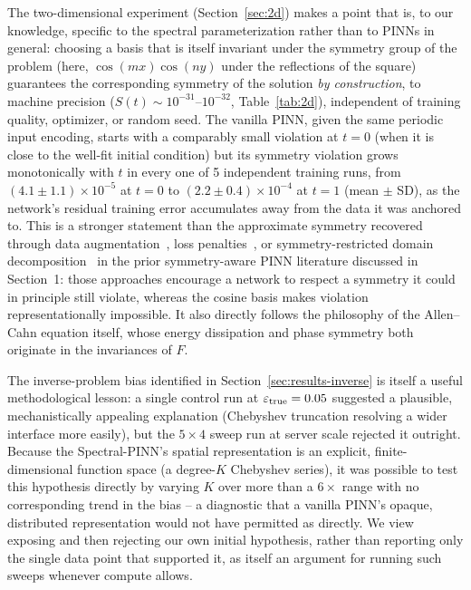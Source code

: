 \documentclass[symmetry,article,submit,moreauthors]{Definitions/mdpi}
\begin{document}
The two-dimensional experiment (Section~\ref{sec:2d}) makes a point that is, to our knowledge, specific to the spectral parameterization rather than to PINNs in general: choosing a basis that is itself invariant under the symmetry group of the problem (here, $\cos(mx)\cos(ny)$ under the reflections of the square) guarantees the corresponding symmetry of the solution \emph{by construction}, to machine precision ($S(t)\sim10^{-31}$--$10^{-32}$, Table~\ref{tab:2d}), independent of training quality, optimizer, or random seed. The vanilla PINN, given the same periodic input encoding, starts with a comparably small violation at $t=0$ (when it is close to the well-fit initial condition) but its symmetry violation grows monotonically with $t$ in every one of 5 independent training runs, from $(4.1\pm1.1)\times10^{-5}$ at $t=0$ to $(2.2\pm0.4)\times10^{-4}$ at $t=1$ (mean $\pm$ SD), as the network's residual training error accumulates away from the data it was anchored to. This is a stronger statement than the approximate symmetry recovered through data augmentation~\cite{Brandstetter2022}, loss penalties~\cite{Zhang_SPINN2023,Zhu_SPINN2022}, or symmetry-restricted domain decomposition~\cite{Liu_SymDD2024} in the prior symmetry-aware PINN literature discussed in Section~1: those approaches encourage a network to respect a symmetry it could in principle still violate, whereas the cosine basis makes violation representationally impossible. It also directly follows the philosophy of the Allen--Cahn equation itself, whose energy dissipation and phase symmetry both originate in the invariances of $F$.

The inverse-problem bias identified in Section~\ref{sec:results-inverse} is itself a useful methodological lesson: a single control run at $\varepsilon_{\rm true}=0.05$ suggested a plausible, mechanistically appealing explanation (Chebyshev truncation resolving a wider interface more easily), but the $5\times4$ sweep run at server scale rejected it outright. Because the Spectral-PINN's spatial representation is an explicit, finite-dimensional function space (a degree-$K$ Chebyshev series), it was possible to test this hypothesis directly by varying $K$ over more than a $6\times$ range with no corresponding trend in the bias -- a diagnostic that a vanilla PINN's opaque, distributed representation would not have permitted as directly. We view exposing and then rejecting our own initial hypothesis, rather than reporting only the single data point that supported it, as itself an argument for running such sweeps whenever compute allows.
\end{document}
